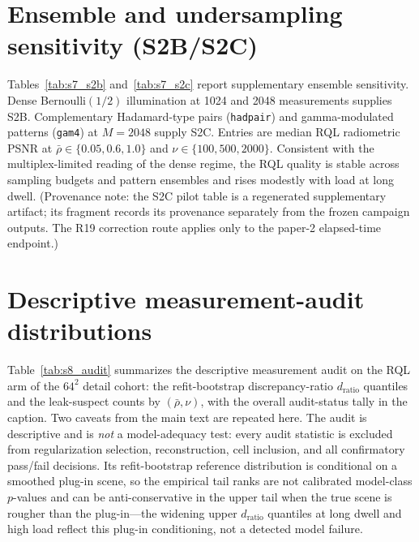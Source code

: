 \documentclass[10pt]{article}
\newcommand{\rhobar}{\bar{\rho}}
\begin{document}
\section{Ensemble and undersampling sensitivity (S2B/S2C)}
\label{sec:s7}

Tables~\ref{tab:s7_s2b} and~\ref{tab:s7_s2c} report supplementary ensemble
sensitivity. Dense Bernoulli$(1/2)$ illumination at
1024 and 2048 measurements supplies S2B. Complementary Hadamard-type pairs
(\texttt{hadpair}) and gamma-modulated patterns (\texttt{gam4}) at $M=2048$
supply S2C. Entries are median RQL radiometric PSNR at
$\rhobar\in\{0.05,0.6,1.0\}$ and
$\nu\in\{100,500,2000\}$. Consistent with the multiplex-limited reading of the
dense regime, the RQL quality is stable across sampling budgets and pattern
ensembles and rises modestly with load at long dwell. (Provenance note: the S2C
pilot table is a regenerated supplementary artifact; its fragment records its
provenance separately from the frozen campaign outputs. The R19 correction
route applies only to the paper-2 elapsed-time endpoint.)



\section{Descriptive measurement-audit distributions}
\label{sec:s8}

Table~\ref{tab:s8_audit} summarizes the descriptive measurement audit on the RQL
arm of the $64^2$ detail cohort: the refit-bootstrap discrepancy-ratio
$d_{\mathrm{ratio}}$ quantiles and the leak-suspect counts by $(\rhobar,\nu)$,
with the overall audit-status tally in the caption. Two caveats from the main
text are repeated here. The audit is descriptive and is \emph{not} a
model-adequacy test: every audit statistic is excluded from regularization
selection, reconstruction, cell inclusion, and all confirmatory pass/fail
decisions. Its refit-bootstrap reference distribution is conditional on a
smoothed plug-in scene, so the empirical tail ranks are not calibrated
model-class $p$-values and can be anti-conservative in the upper tail when the
true scene is rougher than the plug-in---the widening upper $d_{\mathrm{ratio}}$
quantiles at long dwell and high load reflect this plug-in conditioning, not a
detected model failure.


\end{document}
